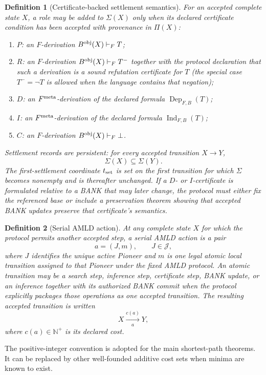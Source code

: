 \documentclass[11pt]{article}
\newtheorem{definition}{Definition}[section]
\theoremstyle{remark}
\newcommand{\N}{\mathbb N}
\newcommand{\Dep}{\operatorname{Dep}}
\newcommand{\Ind}{\operatorname{Ind}}
\newcommand{\Roles}{\mathcal J}
\begin{document}
\begin{definition}[Certificate-backed settlement semantics]
For an accepted complete state $X$, a role may be added to $\Sigma(X)$ only when its declared certificate condition has been accepted with provenance in $\Pi(X)$:
\begin{enumerate}[label=(\roman*),leftmargin=2.3em]
\item $P$: an $F$-derivation $B^{\rm obj}(X)\vdash_F T$;
\item $R$: an $F$-derivation $B^{\rm obj}(X)\vdash_F T^-$ together with the protocol declaration that such a derivation is a sound refutation certificate for $T$ (the special case $T^-=\neg T$ is allowed when the language contains that negation);
\item $D$: an $F^{\rm meta}$-derivation of the declared formula $\Dep_{F,B}(T)$;
\item $I$: an $F^{\rm meta}$-derivation of the declared formula $\Ind_{F,B}(T)$;
\item $C$: an $F$-derivation $B^{\rm obj}(X)\vdash_F\bot$.
\end{enumerate}
Settlement records are persistent: for every accepted transition $X\to Y$,
\[
\Sigma(X)\subseteq\Sigma(Y).
\]
The first-settlement coordinate $t_{\rm set}$ is set on the first transition for which $\Sigma$ becomes nonempty and is thereafter unchanged. If a $D$- or $I$-certificate is formulated relative to a BANK that may later change, the protocol must either fix the referenced base or include a preservation theorem showing that accepted BANK updates preserve that certificate's semantics.
\end{definition}

\begin{definition}[Serial AMLD action]
At any complete state $X$ for which the protocol permits another accepted step, a serial AMLD action is a pair
\[
a=(J,m),\qquad J\in\Roles,
\]
where $J$ identifies the unique active Pioneer and $m$ is one legal atomic local transition assigned to that Pioneer under the fixed AMLD protocol. An atomic transition may be a search step, inference step, certificate step, BANK update, or an inference together with its authorized BANK commit when the protocol explicitly packages those operations as one accepted transition. The resulting accepted transition is written
\[
X\xrightarrow[a]{c(a)}Y,
\]
where $c(a)\in\N^+$ is its declared cost.
\end{definition}

The positive-integer convention is adopted for the main shortest-path theorems. It can be replaced by other well-founded additive cost sets when minima are known to exist.
\end{document}
